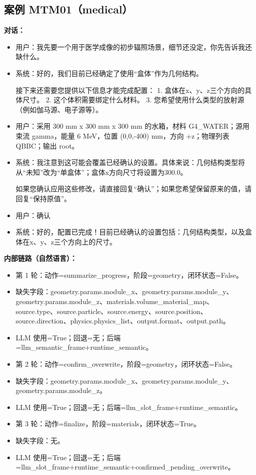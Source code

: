 \documentclass[11pt]{ctexart}
\begin{document}
\subsection{案例 MTM01（medical）}
\textbf{对话：}
\begin{itemize}
\item 用户：我先要一个用于医学成像的初步辐照场景，细节还没定，你先告诉我还缺什么。
\item 系统：好的，我们目前已经确定了使用“盒体”作为几何结构。

接下来还需要您提供以下信息才能完成配置：
1.  盒体在x、y、z三个方向的具体尺寸。
2.  这个体积需要绑定什么材料。
3.  您希望使用什么类型的放射源（例如伽马源、电子源等）。
\item 用户：采用 300 mm x 300 mm x 300 mm 的水箱，材料 G4\_WATER；源用束流 gamma，能量 6 MeV，位置 (0,0,-400) mm，方向 +z；物理列表 QBBC；输出 root。
\item 系统：我注意到这可能会覆盖已经确认的设置。具体来说：几何结构类型将从“未知”改为“单盒体”；盒体x方向尺寸将设置为300.0。

如果您确认应用这些修改，请直接回复“确认”；如果您希望保留原来的值，请回复“保持原值”。
\item 用户：确认
\item 系统：好的，配置已完成！目前已经确认的设置包括：几何结构类型，以及盒体在x、y、z三个方向上的尺寸。
\end{itemize}
\textbf{内部链路（自然语言）：}
\begin{itemize}
\item 第 1 轮：动作=summarize\_progress，阶段=geometry，闭环状态=False。
\item 缺失字段：geometry.params.module\_x、geometry.params.module\_y、geometry.params.module\_z、materials.volume\_material\_map、source.type、source.particle、source.energy、source.position、source.direction、physics.physics\_list、output.format、output.path。
\item LLM 使用=True；回退=无；后端=llm\_semantic\_frame+runtime\_semantic。
\item 第 2 轮：动作=confirm\_overwrite，阶段=geometry，闭环状态=False。
\item 缺失字段：geometry.params.module\_x、geometry.params.module\_y、geometry.params.module\_z。
\item LLM 使用=True；回退=无；后端=llm\_slot\_frame+runtime\_semantic。
\item 第 3 轮：动作=finalize，阶段=materials，闭环状态=True。
\item 缺失字段：无。
\item LLM 使用=True；回退=无；后端=llm\_slot\_frame+runtime\_semantic+confirmed\_pending\_overwrite。
\end{itemize}
\end{document}
